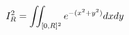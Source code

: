 \documentclass[preview]{standalone}
\begin{document}
\begin{align*}
\special{dvisvgm:raw <g id='unique000'>}I_R^2=\iint_{[0,R]^2}e^{-(x^2+y^2)}dxdy\special{dvisvgm:raw </g>}
\end{align*}
\end{document}
